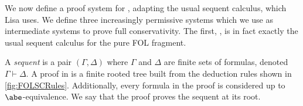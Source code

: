 We now define a proof system for \lamfol, adapting the usual sequent calculus, which Lisa uses. We define three increasingly permissive systems which we use as intermediate systems to prove full conservativity. The first, \SClamA, is in fact exactly the usual sequent calculus for the pure FOL fragment.
\begin{definition}
  \label{def:SClamA}
  A \textit{sequent} is a pair $(\Gamma, \Delta)$ where $\Gamma$ and $\Delta$ are finite sets of formulas, denoted $\Gamma \vdash \Delta$. A proof in \SClamA is a finite rooted tree built from the deduction rules shown in \autoref{fig:FOLSCRules}. Additionally, every formula in the proof is considered up to $\abe$-equivalence.
  We say that the proof proves the sequent at its root.
\end{definition}

